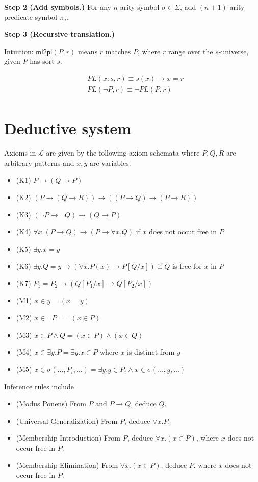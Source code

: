 \documentclass{article}
\theoremstyle{plain}
\def\ml2pl{\textsf{ml2pl}}
\begin{document}
\textbf{Step 2 (Add symbols.)} For any $n$-arity symbol $\sigma \in \Sigma$, add $(n+1)$-arity predicate symbol $\pi_\sigma$.

\textbf{Step 3 (Recursive translation.)}

Intuition: $\ml2pl(P,r)$ means $r$ matches $P$, where $r$ range over the $s$-universe, given $P$ has sort $s$. 

\begin{align*}
&PL(x : s, r) \equiv s(x) \to x = r \\
&PL(\neg P , r) \equiv  \neg PL(P, r) \\
\end{align*}


\section{Deductive system}
Axioms in $\mathcal{L}$ are given by the following axiom schemata where $P, Q, R$ are arbitrary patterns and $x, y$ are variables.
\begin{itemize}
\item (K1) $P \to (Q \to P)$
\item (K2) $(P \to (Q \to R)) \to ((P \to Q) \to (P \to R))$
\item (K3) $(\neg P \to \neg Q) \to (Q \to P)$
\item (K4) $\forall x . (P \to Q) \to (P \to \forall x . Q)$ if $x$ does not occur free in $P$
\item (K5) $\exists y . x = y$
\item (K6) $\exists y . Q = y \to (\forall x . P(x) \to P[Q/x])$ if $Q$ is free for $x$ in $P$
\item (K7) $P_1 = P_2 \to (Q[P_1/x] \to Q[P_2/x])$
\item (M1) $x \in y = (x = y)$
\item (M2) $x \in \neg P = \neg (x \in P)$
\item (M3) $x \in P \wedge Q = (x \in P) \wedge (x \in Q)$
\item (M4) $x \in \exists y . P = \exists y . x \in P$ where $x$ is distinct from $y$
\item (M5) $x \in \sigma(\dots,P_i,\dots) = \exists y . y \in P_i \wedge x \in \sigma(\dots,y,\dots)$
\end{itemize}

Inference rules include
\begin{itemize}
\item (Modus Ponens) From $P$ and $P \to Q$, deduce $Q$.
\item (Universal Generalization) From $P$, deduce $\forall x . P$. 
\item (Membership Introduction) From $P$, deduce $\forall x . (x \in P)$, where $x$ does not occur free in $P$.
\item (Membership Elimination) From $\forall x . (x \in P)$, deduce $P$, where $x$ does not occur free in $P$.
\end{itemize}
\end{document}
